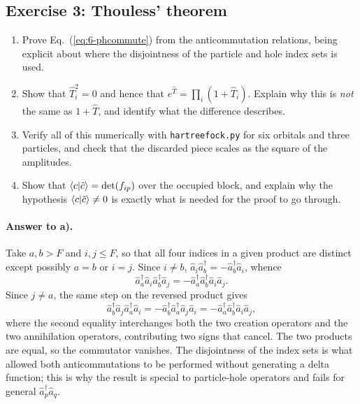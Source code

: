 \subsection*{Exercise 3: Thouless' theorem}
\label{ex:6-thouless}

\begin{enumerate}
  \item[a)] Prove Eq.~(\ref{eq:6-phcommute}) from the anticommutation
  relations, being explicit about where the disjointness of the particle and
  hole index sets is used.
  \item[b)] Show that $\hat{T}_i^2=0$ and hence that
  $e^{\hat{T}}=\prod_i(1+\hat{T}_i)$.  Explain why this is \emph{not} the
  same as $1+\hat{T}$, and identify what the difference describes.
  \item[c)] Verify all of this numerically with \texttt{hartreefock.py} for
  six orbitals and three particles, and check that the discarded piece scales
  as the square of the amplitudes.
  \item[d)] Show that $\langle c \vert \tilde{c} \rangle=\det(f_{ip})$ over the occupied
  block, and explain why the hypothesis $\langle c \vert \tilde{c} \rangle\ne0$ is exactly
  what is needed for the proof to go through.
\end{enumerate}

\paragraph{Answer to a).}
Take $a,b>F$ and $i,j\le F$, so that all four indices in a given product are
distinct except possibly $a=b$ or $i=j$.  Since $i\ne b$,
$\hat{a}_{i}\hat{a}^{\dagger}_{b}=-\hat{a}^{\dagger}_{b}\hat{a}_{i}$, whence
\begin{equation}
  \hat{a}^{\dagger}_{a}\hat{a}_{i}\hat{a}^{\dagger}_{b}\hat{a}_{j}
  = -\hat{a}^{\dagger}_{a}\hat{a}^{\dagger}_{b}\hat{a}_{i}\hat{a}_{j} .
  \label{eq:6-exa3}
\end{equation}
Since $j\ne a$, the same step on the reversed product gives
\begin{equation}
  \hat{a}^{\dagger}_{b}\hat{a}_{j}\hat{a}^{\dagger}_{a}\hat{a}_{i}
  = -\hat{a}^{\dagger}_{b}\hat{a}^{\dagger}_{a}\hat{a}_{j}\hat{a}_{i}
  = -\hat{a}^{\dagger}_{a}\hat{a}^{\dagger}_{b}\hat{a}_{i}\hat{a}_{j},
  \label{eq:6-exb3}
\end{equation}
where the second equality interchanges both the two creation operators and
the two annihilation operators, contributing two signs that cancel.  The two
products are equal, so the commutator vanishes.  The disjointness of the index
sets is what allowed both anticommutations to be performed without generating
a delta function; this is why the result is special to particle-hole
operators and fails for general $\hat{a}^{\dagger}_p\hat{a}_q$.

